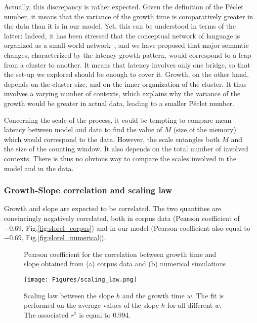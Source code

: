 \documentclass[12pt,twocolumn,amsmath,amssymb,aps,longbibliography]{revtex4-1}  %
\begin{document}
Actually, this discrepancy is rather expected. Given the definition of the P\'eclet number, it means that the variance of the growth time is comparatively greater in the data than it is in our model. Yet, this can be understood in terms of the latter: Indeed, it has been stressed that the conceptual network of language is organized as a small-world network~\cite{gaume2008semantic}, %
and we have proposed that major semantic changes, characterized by the latency-growth pattern, would correspond to a leap from a cluster to another. It means that latency involves only one bridge, so that the set-up we explored should be enough to cover it. Growth, on the other hand, depends on the cluster size, and on the inner organization of the cluster. It thus involves a varying number of contexts, which explains why the variance of the growth would be greater in actual data, leading to a smaller P\'eclet number. 

Concerning the scale of the process, it could be tempting to compare mean latency between model and data to find the value of $M$ (size of the memory) which would correspond to the data. However, the scale entangles both $M$ and the size of the counting window. It also depends on the total number of involved contexts. There is thus no obvious way to compare the scales involved in the model and in the data. 

\subsubsection{Growth-Slope correlation and scaling law}

Growth and slope are expected to be correlated. The two quantities are convincingly negatively correlated, both in corpus data (Pearson coefficient of $-0.69$, Fig.\ref{fig:slorel_corpus}) and in our model (Pearson coefficient also equal to $-0.69$, Fig.\ref{fig:slorel_numerical}).

\begin{figure}[!tbp]
  \centering
  \hfill
  \caption{Pearson coefficient for the correlation between growth time and slope obtained from (a) corpus data and (b) numerical simulations}
\end{figure}

\begin{figure*}[!tp]
  \centering
  \texttt{[image: Figures/scaling\_law.png]}
  \caption{Scaling law between the slope $h$ and the growth time $w$. The fit is performed on the average values of the slope $h$ for all different $w$. The associated $r^2$ is equal to 0.994.}
  \label{fig:scaling_law}
\end{figure*}
\end{document}
